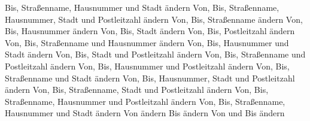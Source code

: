 \begin{usecase}
{		\checkeditem[1.bs] Bis, Straßenname, Hausnummer und Stadt ändern
		\checkeditem[1.bt] Von, Bis, Straßenname, Hausnummer, Stadt und Postleitzahl ändern
		\checkeditem[1.bu] Von, Bis, Straßenname ändern
		\checkeditem[1.bv] Von, Bis, Hausnummer ändern
		\checkeditem[1.bw] Von, Bis, Stadt ändern
		\checkeditem[1.bx] Von, Bis, Postleitzahl ändern
		\checkeditem[1.by] Von, Bis, Straßenname und Hausnummer ändern
		\checkeditem[1.bz] Von, Bis, Hausnummer und Stadt ändern
		\checkeditem[1.ca] Von, Bis, Stadt und Postleitzahl ändern
		\checkeditem[1.cb] Von, Bis, Straßenname und Postleitzahl ändern
		\checkeditem[1.cc] Von, Bis, Hausnummer und Postleitzahl ändern
		\checkeditem[1.cd] Von, Bis, Straßenname und Stadt ändern
		\checkeditem[1.ce] Von, Bis, Hausnummer, Stadt und Postleitzahl ändern
		\checkeditem[1.cf] Von, Bis, Straßenname, Stadt und Postleitzahl ändern
		\checkeditem[1.cg] Von, Bis, Straßenname, Hausnummer und Postleitzahl ändern
		\checkeditem[1.ch] Von, Bis, Straßenname, Hausnummer und Stadt ändern
		\checkeditem[1.ci] Von ändern
		\checkeditem[1.cj] Bis ändern
		\checkeditem[1.ck] Von und Bis ändern
	}
	

	
\end{usecase}

\newpage
\begin{usecase}
	
	
	
	
	
	
\end{usecase}

